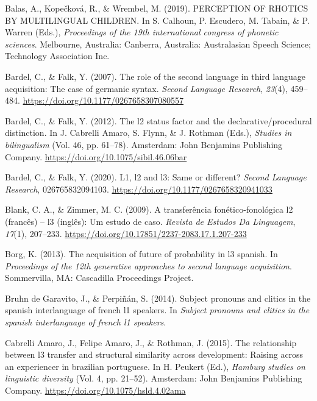 \documentclass[
  english,
  man]{apa6}
\begin{document}
\leavevmode\hypertarget{ref-balas_perception_2019}{}%
Balas, A., Kopečková, R., \& Wrembel, M. (2019). PERCEPTION OF RHOTICS BY MULTILINGUAL CHILDREN. In S. Calhoun, P. Escudero, M. Tabain, \& P. Warren (Eds.), \emph{Proceedings of the 19th international congress of phonetic sciences}. Melbourne, Australia: Canberra, Australia: Australasian Speech Science; Technology Association Inc.

\leavevmode\hypertarget{ref-bardel_role_2007}{}%
Bardel, C., \& Falk, Y. (2007). The role of the second language in third language acquisition: The case of germanic syntax. \emph{Second Language Research}, \emph{23}(4), 459--484. \url{https://doi.org/10.1177/0267658307080557}

\leavevmode\hypertarget{ref-cabrelli_amaro_l2_2012}{}%
Bardel, C., \& Falk, Y. (2012). The l2 status factor and the declarative/procedural distinction. In J. Cabrelli Amaro, S. Flynn, \& J. Rothman (Eds.), \emph{Studies in bilingualism} (Vol. 46, pp. 61--78). Amsterdam: John Benjamins Publishing Company. \url{https://doi.org/10.1075/sibil.46.06bar}

\leavevmode\hypertarget{ref-bardel_l1_2020}{}%
Bardel, C., \& Falk, Y. (2020). L1, l2 and l3: Same or different? \emph{Second Language Research}, 026765832094103. \url{https://doi.org/10.1177/0267658320941033}

\leavevmode\hypertarget{ref-blank_transferencia_2009}{}%
Blank, C. A., \& Zimmer, M. C. (2009). A transferência fonético-fonológica l2 (francês) -- l3 (inglês): Um estudo de caso. \emph{Revista de Estudos Da Linguagem}, \emph{17}(1), 207--233. \url{https://doi.org/10.17851/2237-2083.17.1.207-233}

\leavevmode\hypertarget{ref-borg_acquisition_2013}{}%
Borg, K. (2013). The acquisition of future of probability in l3 spanish. In \emph{Proceedings of the 12th generative approaches to second language acquisition}. Sommervilla, MA: Cascadilla Proceedings Project.

\leavevmode\hypertarget{ref-bruhn_de_garavito_subject_2014}{}%
Bruhn de Garavito, J., \& Perpiñán, S. (2014). Subject pronouns and clitics in the spanish interlanguage of french l1 speakers. In \emph{Subject pronouns and clitics in the spanish interlanguage of french l1 speakers}.

\leavevmode\hypertarget{ref-peukert_relationship_2015}{}%
Cabrelli Amaro, J., Felipe Amaro, J., \& Rothman, J. (2015). The relationship between l3 transfer and structural similarity across development: Raising across an experiencer in brazilian portuguese. In H. Peukert (Ed.), \emph{Hamburg studies on linguistic diversity} (Vol. 4, pp. 21--52). Amsterdam: John Benjamins Publishing Company. \url{https://doi.org/10.1075/hsld.4.02ama}
\end{document}
